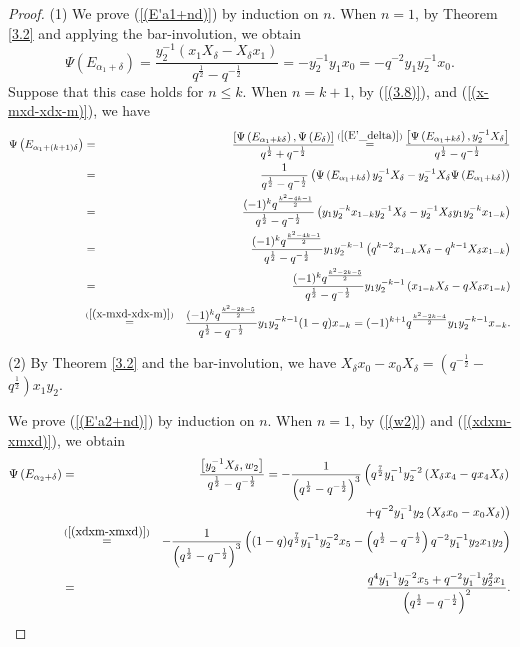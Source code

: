 \documentclass[reqno,11pt]{amsart}
\numberwithin{equation}{section}
\begin{document}
\begin{proof}
(1) We prove (\ref{(E'a1+nd)}) by induction on $n$. When $n=1$, by Theorem \ref{3.2} and applying the bar-involution, we obtain
$$\Psi\left(E_{\alpha_1+\delta}\right)=\frac{y_2^{-1}\left(x_1 X_\delta-X_\delta x_1\right)}{q^{\frac{1}{2}}-q^{-\frac{1}{2}}}=-y_2^{-1} y_1 x_0=-q^{-2} y_1 y_2^{-1} x_0 .$$
Suppose that this case holds for $n \le k$. When $n=k+1$, by (\ref{(3.8)}), and (\ref{(x-mxd-xdx-m)}), we have\begingroup
{}
\begin{eqnarray*}
	\Psi\left(E_{\alpha_1+(k+1) \delta}\right)&=&\frac{{\left[ {\Psi \left( {{E_{{\alpha _1} + k\delta }}} \right),\Psi \left( {{E_\delta }} \right)} \right]}}{{{q^{\frac{1}{2}}} + {q^{ - \frac{1}{2}}}}}  \mathop  = \limits^{ (\ref{(E'_delta)})}\frac{\left[\Psi\left(E_{\alpha_1+k \delta}\right), y_2^{-1} X_\delta\right]}{q^{\frac{1}{2}}-q^{-\frac{1}{2}}} \\
	& =&\frac{1}{q^{\frac{1}{2}}-q^{-\frac{1}{2}}}\left(\Psi\left(E_{\alpha_1+k \delta}\right) y_2^{-1} X_\delta-y_2^{-1} X_\delta \Psi\left(E_{\alpha_1+k \delta}\right)\right) \\
	& =&\frac{(-1)^k q^{\frac{k^2-4 k-1}{2}}}{q^{\frac{1}{2}}-q^{-\frac{1}{2}}}\left(y_1 y_2^{-k} x_{1-k} y_2^{-1} X_\delta-y_2^{-1} X_\delta y_1 y_2^{-k} x_{1-k}\right) \\
	& =&\frac{(-1)^k q^{\frac{k^2-4 k-1}{2}}}{q^{\frac{1}{2}}-q^{-\frac{1}{2}}} y_1 y_2^{-k-1}\left(q^{k-2} x_{1-k} X_\delta-q^{k-1} X_\delta x_{1-k}\right) \\
	& =&\frac{(-1)^k q^{\frac{k^2-2 k-5}{2}}}{q^{\frac{1}{2}}-q^{-\frac{1}{2}}} y_1 y_2^{-k-1}\left(x_{1-k} X_\delta-q X_\delta x_{1-k}\right) \\
	& \mathop  = \limits^{(\ref{(x-mxd-xdx-m)})}&\frac{(-1)^k q^{\frac{k^2-2 k-5}{2}}}{q^{\frac{1}{2}}-q^{-\frac{1}{2}}} y_1 y_2^{-k-1}(1-q) x_{-k}=(-1)^{k+1} q^{\frac{k^2-2 k-4}{2}} y_1 y_2^{-k-1} x_{-k} .
\end{eqnarray*}

(2) By Theorem \ref{3.2} and the bar-involution, we have $X_\delta x_0-x_0 X_\delta=\left(q^{-\frac{1}{2}}-\right.$ $\left.q^{\frac{1}{2}}\right) x_1 y_2$.

We prove (\ref{(E'a2+nd)}) by induction on $n$. When $n=1$, by (\ref{(w2)}) and  (\ref{(xdxm-xmxd)}), we obtain
\begin{eqnarray*}
	\Psi\left(E_{\alpha_2+\delta}\right)&= & \frac{\left[y_2^{-1} X_\delta, w_2\right]}{q^{\frac{1}{2}}-q^{-\frac{1}{2}}}=-\frac{1}{\left(q^{\frac{1}{2}}-q^{-\frac{1}{2}}\right)^3}\left(q^{\frac{7}{2}} y_1^{-1} y_2^{-2}\left(X_\delta x_4-q x_4 X_\delta\right)\right. \\
	&& \left.+q^{-2} y_1^{-1} y_2\left(X_\delta x_0-x_0 X_\delta\right)\right) \\
	& \mathop  = \limits^{(\ref{(xdxm-xmxd)})} & -\frac{1}{\left(q^{\frac{1}{2}}-q^{-\frac{1}{2}}\right)^3}\left((1-q) q^{\frac{7}{2}} y_1^{-1} y_2^{-2} x_5-\left(q^{\frac{1}{2}}-q^{-\frac{1}{2}}\right) q^{-2} y_1^{-1} y_2 x_1 y_2\right) \\
&	= & \frac{q^4 y_1^{-1} y_2^{-2} x_5+q^{-2} y_1^{-1} y_2^2 x_1}{\left(q^{\frac{1}{2}}-q^{-\frac{1}{2}}\right)^2} .
\end{eqnarray*}


\end{proof}
\end{document}

